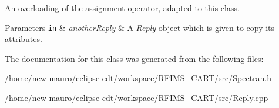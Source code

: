 An overloading of the assignment operator, adapted to this class. 


\begin{DoxyParams}[1]{Parameters}
\mbox{\tt in}  & {\em another\+Reply} & A {\itshape \hyperlink{classReply}{Reply}} object which is given to copy its attributes. \\
\hline
\end{DoxyParams}


The documentation for this class was generated from the following files\+:\begin{DoxyCompactItemize}
\item 
/home/new-\/mauro/eclipse-\/cdt/workspace/\+R\+F\+I\+M\+S\+\_\+\+C\+A\+R\+T/src/\hyperlink{Spectran_8h}{Spectran.\+h}\item 
/home/new-\/mauro/eclipse-\/cdt/workspace/\+R\+F\+I\+M\+S\+\_\+\+C\+A\+R\+T/src/\hyperlink{Reply_8cpp}{Reply.\+cpp}\end{DoxyCompactItemize}
